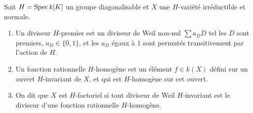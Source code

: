\begin{defn}
Soit $H=\operatorname{Spec} k[K]$ un groupe diagonalisable et $X$ une $H$-variété irréductible et normale.
\begin{enumerate}
\item Un diviseur $H$-premier est un diviseur de Weil non-nul $\sum a_DD$ tel les $D$ sont premiers, $a_D\in\lbrace 0,1\rbrace$, et les $a_D$ égaux à $1$ sont permutés transitivement par l'action de $H$.
\item Un fonction rationnelle $H$-homogène est un élément $f\in k(X)$ défini sur un ouvert $H$-invariant de $X$, et qui est $H$-homogène sur cet ouvert.
\item On dit que $X$ est $H$-factoriel si tout diviseur de Weil $H$-invariant est le diviseur d'une fonction rationnelle $H$-homogène.
\end{enumerate}
\end{defn}


